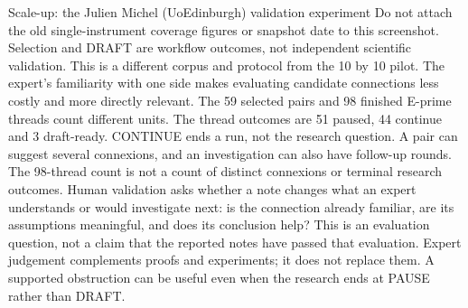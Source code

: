 \documentclass[aspectratio=1610,11pt]{beamer}
\begin{document}
\begin{frame}[t]{Scale-up: the Julien Michel (UoEdinburgh) validation experiment}
{Do not attach the old single-instrument coverage figures or snapshot date to this screenshot.
Selection and DRAFT are workflow outcomes, not independent scientific validation.
This is a different corpus and protocol from the 10 by 10 pilot. The expert's familiarity
with one side makes evaluating candidate connections less costly and more directly relevant.
The 59 selected pairs and 98 finished E-prime threads count different units. The thread outcomes
are 51 paused, 44 continue and 3 draft-ready. CONTINUE ends a run, not the research question.
A pair can suggest several connexions, and an investigation can also have follow-up rounds.
The 98-thread count is not a count of distinct connexions or terminal research outcomes.
Human validation asks whether a note changes what an expert understands or would investigate next:
is the connection already familiar, are its assumptions meaningful, and does its conclusion help?
This is an evaluation question, not a claim that the reported notes have passed that evaluation.
Expert judgement complements proofs and experiments; it does not replace them.
A supported obstruction can be useful even when the research ends at PAUSE rather than DRAFT.}
\end{frame}
\end{document}
